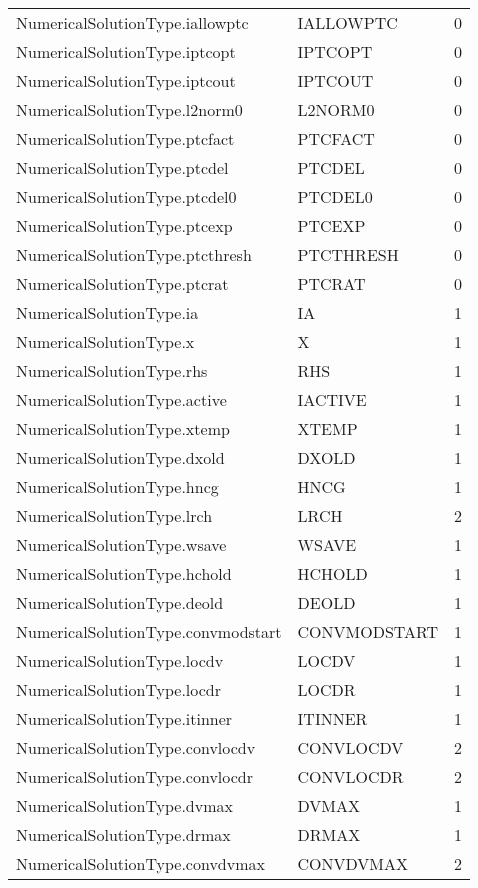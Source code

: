 \begin{longtable}{p{6cm} p{4cm} p{2cm} }
NumericalSolutionType.iallowptc &  IALLOWPTC & 0 \\ 
NumericalSolutionType.iptcopt &  IPTCOPT & 0 \\ 
NumericalSolutionType.iptcout &  IPTCOUT & 0 \\ 
NumericalSolutionType.l2norm0 &  L2NORM0 & 0 \\ 
NumericalSolutionType.ptcfact &  PTCFACT & 0 \\ 
NumericalSolutionType.ptcdel &  PTCDEL & 0 \\ 
NumericalSolutionType.ptcdel0 &  PTCDEL0 & 0 \\ 
NumericalSolutionType.ptcexp &  PTCEXP & 0 \\ 
NumericalSolutionType.ptcthresh &  PTCTHRESH & 0 \\ 
NumericalSolutionType.ptcrat &  PTCRAT & 0 \\ 
NumericalSolutionType.ia &  IA & 1 \\ 
NumericalSolutionType.x &  X & 1 \\ 
NumericalSolutionType.rhs &  RHS & 1 \\ 
NumericalSolutionType.active &  IACTIVE & 1 \\ 
NumericalSolutionType.xtemp &  XTEMP & 1 \\ 
NumericalSolutionType.dxold &  DXOLD & 1 \\ 
NumericalSolutionType.hncg &  HNCG & 1 \\ 
NumericalSolutionType.lrch &  LRCH & 2 \\ 
NumericalSolutionType.wsave &  WSAVE & 1 \\ 
NumericalSolutionType.hchold &  HCHOLD & 1 \\ 
NumericalSolutionType.deold &  DEOLD & 1 \\ 
NumericalSolutionType.convmodstart &  CONVMODSTART & 1 \\ 
NumericalSolutionType.locdv &  LOCDV & 1 \\ 
NumericalSolutionType.locdr &  LOCDR & 1 \\ 
NumericalSolutionType.itinner &  ITINNER & 1 \\ 
NumericalSolutionType.convlocdv &  CONVLOCDV & 2 \\ 
NumericalSolutionType.convlocdr &  CONVLOCDR & 2 \\ 
NumericalSolutionType.dvmax &  DVMAX & 1 \\ 
NumericalSolutionType.drmax &  DRMAX & 1 \\ 
NumericalSolutionType.convdvmax &  CONVDVMAX & 2 \\ 

\end{longtable}
